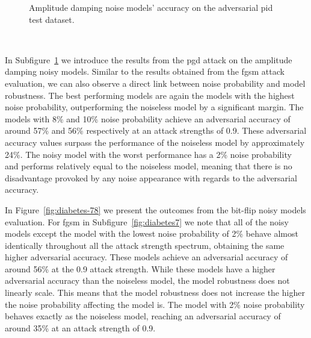 \begin{figure}[!h]
\begin{subfigure}{0.45\textwidth}
      \label{fig:diabetes6}
  \end{subfigure}
  \caption{Amplitude damping noise models' accuracy on the adversarial \ac{pid} test dataset.}
  \label{fig:diabetes-56}
\end{figure} \

In Subfigure~\ref{fig:diabetes6} we introduce the results from the \ac{pgd}
attack on the amplitude damping noisy models. Similar to the results
obtained from the \ac{fgsm} attack evaluation, we can also observe
a direct link between noise probability and model robustness.
The best performing models are again the models with the highest noise
probability, outperforming the noiseless model by a significant margin.
The models with 8\% and 10\% noise probability achieve an adversarial
accuracy of around 57\% and 56\% respectively at an attack strengths of
0.9. These adversarial accuracy values surpass the performance of
the noiseless model by approximately 24\%. The noisy model with the
worst performance has a 2\% noise probability and performs relatively
equal to the noiseless model, meaning that there is no disadvantage
provoked by any noise appearance with regards to the adversarial accuracy. \

In Figure~\ref{fig:diabetes-78} we present the outcomes from the bit-flip
noisy models evaluation. For \ac{fgsm} in Subfigure~\ref{fig:diabetes7}
we note that all of the noisy models except the model with the lowest
noise probability of 2\% behave almost identically throughout all the
attack strength spectrum, obtaining the same higher adversarial
accuracy. These models achieve an adversarial accuracy of around 56\% at
the 0.9 attack strength. While these models have a higher adversarial
accuracy than the noiseless model, the model robustness does not linearly
scale. This means that the model robustness does not increase the
higher the noise probability affecting the model is. The model with
2\% noise probability behaves exactly as the noiseless model, reaching
an adversarial accuracy of around 35\% at an attack strength of 0.9. \

